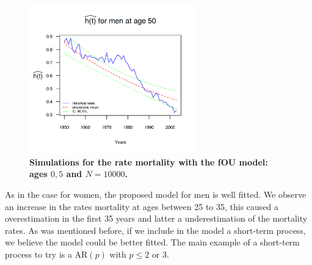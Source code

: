 \documentclass[12pt,reqno]{amsart}
\theoremstyle{definition}
\theoremstyle{remark}
\numberwithin{equation}{section}
\begin{document}
\begin{figure}[H]
\includegraphics[width = 2.85in]{PlotMen50.png}
\caption{\bf Simulations for the rate mortality with the fOU model: ages $0,5$ and $N=10000$.}
\label{graph-simu_FOU3}
\end{figure}\vspace*{0.1cm}

As in the case for women, the proposed model for men is well fitted. 
We observe an increase in the rates mortality at ages between 25 to 35, this caused a overestimation in the first 35 years and latter a underestimation
of the mortality rates. As was mentioned before, if we include in the model a short-term process,  we believe the model could be better fitted. The main example  of a short-term process to try is a AR$(p)$ with $p\le 2$ or $3$.
\end{document}
